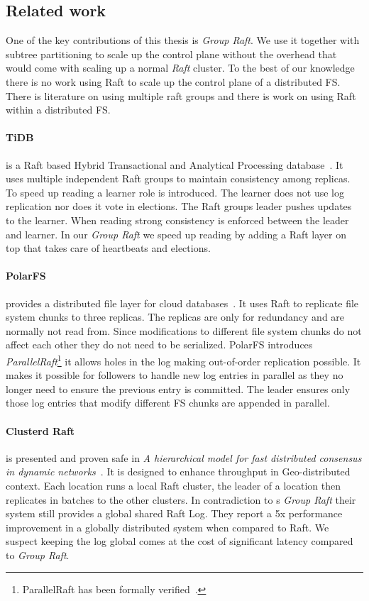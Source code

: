 \subsection{Related work} \label{sec:rel}
One of the key contributions of this thesis is \textit{Group Raft}. We use it together with subtree partitioning to scale up the control plane without the overhead that would come with scaling up a normal \textit{Raft} cluster. To the best of our knowledge there is no work using Raft to scale up the control plane of a distributed FS. There is literature on using multiple raft groups and there is work on using Raft within a distributed FS.
%
\paragraph{TiDB} is a Raft based Hybrid Transactional and Analytical Processing database~\cite{tidb}. It uses multiple independent Raft groups to maintain consistency among replicas. To speed up reading a learner role is introduced. The learner does not use log replication nor does it vote in elections. The Raft groups leader pushes updates to the learner. When reading strong consistency is enforced between the leader and learner. In our \textit{Group Raft} we speed up reading by adding a Raft layer on top that takes care of heartbeats and elections.
%
\paragraph{PolarFS} provides a distributed file layer for cloud databases~\cite{polarfs}. It uses Raft to replicate file system chunks to three replicas. The replicas are only for redundancy and are normally not read from. Since modifications to different file system chunks do not affect each other they do not need to be serialized. PolarFS introduces \textit{ParallelRaft}\footnote{ParallelRaft has been formally verified~\cite{verify}.} it allows holes in the log making out-of-order replication possible. It makes it possible for followers to handle new log entries in parallel as they no longer need to ensure the previous entry is committed. The leader ensures only those log entries that modify different FS chunks are appended in parallel.
%
\paragraph{Clusterd Raft} is presented and proven safe in \textit{A hierarchical model for fast distributed consensus in dynamic networks}~\cite{craft}. It is designed to enhance throughput in Geo-distributed context. Each location runs a local Raft cluster, the leader of a location then replicates in batches to the other clusters. In contradiction to \name{}s \textit{Group Raft} their system still provides a global shared Raft Log. They report a 5x performance improvement in a globally distributed system when compared to Raft. We suspect keeping the log global comes at the cost of significant latency compared to \textit{Group Raft}.
